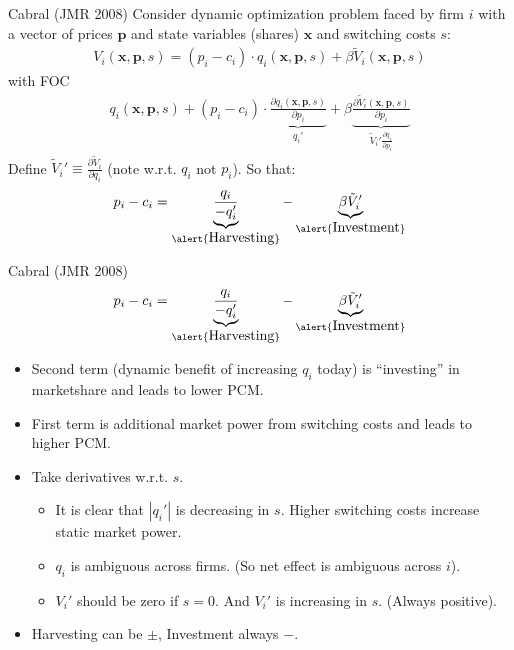 \documentclass[xcolor=pdftex,dvipsnames,table,mathserif,aspectratio=169]{beamer}
\begin{document}
\begin{frame}{Cabral (JMR 2008)}
Consider dynamic optimization problem faced by firm $i$ with a vector of prices $\mathbf{p}$ and state variables (shares) $\mathbf{x}$ and switching costs $s$:
\begin{eqnarray*}
V_i(\mathbf{x},\mathbf{p},s) = (p_i - c_i) \cdot q_i(\mathbf{x},\mathbf{p},s) + \beta \tilde{V}_i(\mathbf{x},\mathbf{p},s)
\end{eqnarray*}
with FOC
\vspace{-.3cm}
\begin{eqnarray*}
q_i(\mathbf{x},\mathbf{p},s) +  (p_i - c_i) \cdot \underbrace{\frac{\partial q_i(\mathbf{x},\mathbf{p},s)}{\partial p_i}}_{q_i'} +  \beta  \underbrace{\frac{\partial \tilde{V}_i(\mathbf{x},\mathbf{p},s)}{\partial p_i}}_{\tilde{V}_i' \frac{\partial q_i}{\partial p_i}}
\end{eqnarray*}
\vspace{-.3cm}
Define $\tilde{V}_i' \equiv \frac{\partial \tilde{V}_i}{\partial q_i}$ (note w.r.t. $q_i$ not $p_i$). So that:
\begin{eqnarray*}
p_i - c_i = \underbrace{\frac{q_i}{-q_i'}}_{\alert{\mbox{Harvesting}}} - \underbrace{\beta \tilde{V}_i'}_{\alert{\mbox{Investment}}}
\end{eqnarray*}
\end{frame} 

\begin{frame}{Cabral (JMR 2008)}
\small
\begin{eqnarray*}
p_i - c_i = \underbrace{\frac{q_i}{-q_i'}}_{\alert{\mbox{Harvesting}}} - \underbrace{\beta \tilde{V}_i'}_{\alert{\mbox{Investment}}}
\end{eqnarray*}
\vspace{-.3cm}
\begin{itemize}
\item Second term (dynamic benefit of increasing $q_i$ today) is ``investing'' in marketshare and leads to lower PCM.
\item First term is additional market power from switching costs and leads to higher PCM.
\item Take derivatives w.r.t. $s$.
\begin{itemize}
\item It is clear that $|q_i'|$ is decreasing in $s$. Higher switching costs increase static market power.
\item $q_i$ is ambiguous across firms. (So net effect is ambiguous across $i$).
\item $V_i'$ should be zero if $s=0$. And $V_i'$ is increasing in $s$. (Always positive).
\end{itemize}
\item Harvesting can be $\pm$, Investment always $-$.
\end{itemize}
\end{frame} 
\end{document}
